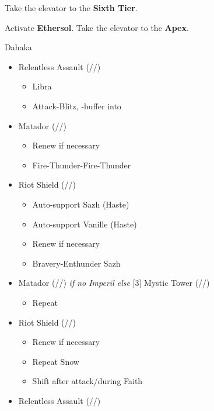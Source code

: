 \begin{multicols}{2}
	\renewcommand{\first}{[1] Riot Shield (\syn/\sen/\rav)}
	\renewcommand{\second}{[2] Relentless Assault (\com/\rav/\rav)}
	\renewcommand{\third}{[3] Mystic Tower (\rav/\sen/\rav)}
	\renewcommand{\fourth}{[4] Aggression (\com/\com/\rav)}
	\renewcommand{\fifth}{[5] Matador (\rav/\sen/\sab)}
	\renewcommand{\sixth}{[6] Aggression (\com/\com/\rav)}

	Take the elevator to the \textbf{Sixth Tier}.

	Activate \textbf{Ethersol}.
	Take the elevator to the \textbf{Apex}.

	\begin{battle}[1:30]{Dahaka}
		\begin{itemize}
			\item \second
			      \begin{itemize}
				      \item Libra
				      \item Attack-Blitz, \rav-buffer into
			      \end{itemize}
			\item \fifth
			      \begin{itemize}
				      \item Renew if necessary
				      \item Fire-Thunder-Fire-Thunder
			      \end{itemize}
			\item \first
			      \begin{itemize}
				      \item Auto-support Sazh (Haste)
				      \item Auto-support Vanille (Haste)
				      \item Renew if necessary
				      \item Bravery-Enthunder Sazh
			      \end{itemize}
			\item \fifth \textit{ if no Imperil else } \third
			      \begin{itemize}
				      \item Repeat
			      \end{itemize}
			\item \first
			      \begin{itemize}
				      \item Renew if necessary
				      \item Repeat Snow
				      \item Shift after attack/during Faith
			      \end{itemize}
			\item \second

\end{itemize}
\end{battle}
\end{multicols}
